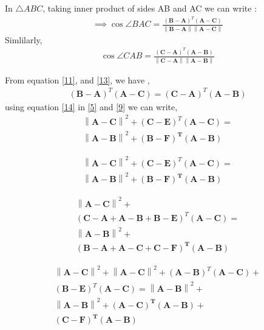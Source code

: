 \documentclass[journal,12pt,twocolumn]{IEEEtran}
\let\vec\mathbf
\newcommand{\norm}[1]{\left\lVert#1\right\rVert}
\begin{document}
   In $\triangle ABC$, taking inner product of sides  AB and AC we can write :
   \begin{align}
\implies \cos \angle BAC = \frac{\left( \vec{ B - A} \right)^T  \left( \vec{A - C } \right)}{\norm{\vec{ B - A}} \norm{\vec{A - C}}} \label{11}
\end{align}  
Simlilarly,
 \begin{align}
  \cos \angle CAB = \frac{\left( \vec{C - A} \right)^T \left( \vec{A - B} \right) }{\norm{\vec{C - A}} \norm{\vec{ A - B}}}  \label{13}
\end{align}  
  
  From equation \ref{11}, and \ref{13}, we have ,
  \begin{multline} 
    \left( \vec{ B - A} \right)^T  \left( \vec{A - C } \right) =  \left( \vec{ C - A} \right)^T  \left( \vec{A - B } \right) \label{14}
   \end{multline} 
 using equation \ref{14} in \ref{5} and \ref{9} we can write,
   \begin{multline} 
   \norm{\vec{A - C}}^2 + \left ( \vec{ C - E }\right)^T \left( \vec{A - C} \right)  =  \\ \norm{\vec{A - B}}^2 + \vec{\left (  B - F\right)^{T} \left( A - B \right)}
    \end{multline} 
   
  \begin{multline} 
\norm{\vec{A - C}}^2 + \left ( \vec{ C - E }\right)^T \left( \vec{A - C} \right)  =  \\ \norm{\vec{A - B}}^2 + \vec{\left (  B - F\right)^{T} \left( A - B \right)}
 \end{multline}   
   
    \begin{multline} 
  \norm{\vec{A - C}}^2 +\\ \left ( \vec{ C - A + A - B +B - E }\right)^T \left( \vec{A - C} \right)  = \\ \norm{\vec{A - B}}^2 +\\ \vec{\left (  B - A + A - C + C - F\right)^{T} \left( A - B \right)}
   \end{multline}   
  
 \begin{multline} 
\norm{\vec{A - C}}^2 +  \norm{\vec{A - C}}^2 + \left ( \vec{  A - B  }\right)^T \left( \vec{A - C} \right) +\\ \left ( \vec{   B - E }\right)^T  \left( \vec{A - C} \right) =   \norm{\vec{A - B}}^2 +\\ \norm{\vec{A - B}}^2 + \vec{\left ( A - C \right)^{T} \left( A - B \right)}  + \\ \vec{\left (  C - F\right)^{T} \left( A - B \right)} \label{18}
 \end{multline}    
  
\end{document}

